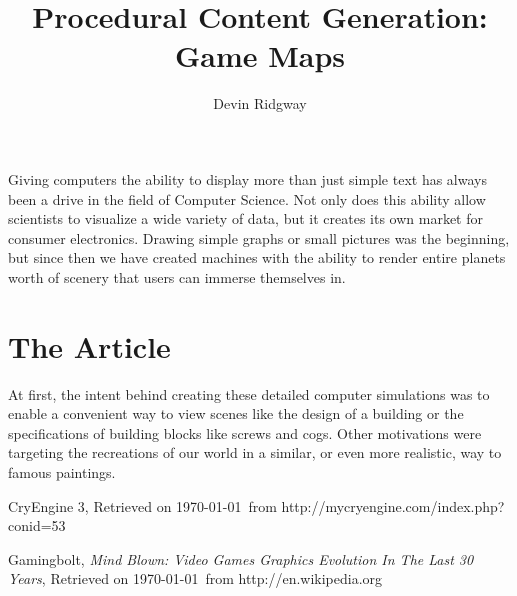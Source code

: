 \documentclass[12pt,a4paper]{article}
\title{Procedural Content Generation: Game Maps}
\author{Devin Ridgway}
\begin{document}
\maketitle

Giving computers the ability to display more than just simple text has always been a drive in the field of Computer Science. Not only does this ability allow scientists to visualize a wide variety of data, but it creates its own market for consumer electronics. Drawing simple graphs or small pictures was the beginning, but since then we have created machines with the ability to render entire planets worth of scenery that users can immerse themselves in.

\section{The Article}

At first, the intent behind creating these detailed computer simulations was to enable a convenient way to view scenes like the design of a building or the specifications of building blocks like screws and cogs. Other motivations were targeting the recreations of our world in a similar, or even more realistic, way to famous paintings.


\newpage
\begin{thebibliography}{2}

  CryEngine 3,
  Retrieved on \today\ from http://mycryengine.com/index.php?conid=53

  Gamingbolt,
  \emph{Mind Blown: Video Games Graphics Evolution In The Last 30 Years},
  Retrieved on \today\ from http://en.wikipedia.org

\end{thebibliography}
\end{document}
